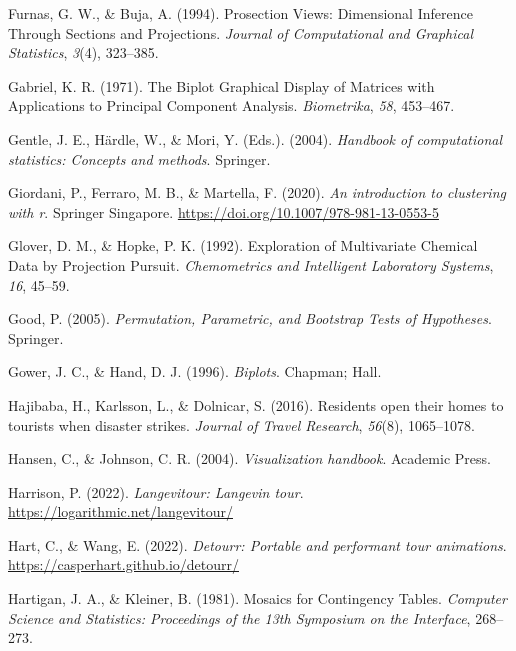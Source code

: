 \documentclass[
  letterpaper,
]{krantz}
\newlength{\cslhangindent}
\newlength{\cslentryspacingunit} %
\newenvironment{CSLReferences}[2] %
 {%
  \setlength{\parindent}{0pt}
  \ifodd #1
  \let\oldpar\par
  \def\par{\hangindent=\cslhangindent\oldpar}
  \fi
  \setlength{\parskip}{#2\cslentryspacingunit}
 }%
 {}
\begin{document}
\begin{CSLReferences}{1}{0}
\leavevmode{}%
Furnas, G. W., \& Buja, A. (1994). Prosection {V}iews: {D}imensional
{I}nference {T}hrough {S}ections and {P}rojections. \emph{Journal of
Computational and Graphical Statistics}, \emph{3}(4), 323--385.

\leavevmode{}%
Gabriel, K. R. (1971). The {B}iplot {G}raphical {D}isplay of {M}atrices
with {A}pplications to {P}rincipal {C}omponent {A}nalysis.
\emph{Biometrika}, \emph{58}, 453--467.

\leavevmode{}%
Gentle, J. E., Härdle, W., \& Mori, Y. (Eds.). (2004). \emph{Handbook of
computational statistics: Concepts and methods}. Springer.

\leavevmode{}%
Giordani, P., Ferraro, M. B., \& Martella, F. (2020). \emph{An
introduction to clustering with r}. Springer Singapore.
\url{https://doi.org/10.1007/978-981-13-0553-5}

\leavevmode{}%
Glover, D. M., \& Hopke, P. K. (1992). {E}xploration of {M}ultivariate
{C}hemical {D}ata by {P}rojection {P}ursuit. \emph{Chemometrics and
Intelligent Laboratory Systems}, \emph{16}, 45--59.

\leavevmode{}%
Good, P. (2005). \emph{Permutation, {P}arametric, and {B}ootstrap
{T}ests of {H}ypotheses}. Springer.

\leavevmode{}%
Gower, J. C., \& Hand, D. J. (1996). \emph{Biplots}. Chapman; Hall.

\leavevmode{}%
Hajibaba, H., Karlsson, L., \& Dolnicar, S. (2016). Residents open their
homes to tourists when disaster strikes. \emph{Journal of Travel
Research}, \emph{56}(8), 1065--1078.

\leavevmode{}%
Hansen, C., \& Johnson, C. R. (2004). \emph{Visualization handbook}.
Academic Press.

\leavevmode{}%
Harrison, P. (2022). \emph{Langevitour: Langevin tour}.
\url{https://logarithmic.net/langevitour/}

\leavevmode{}%
Hart, C., \& Wang, E. (2022). \emph{Detourr: Portable and performant
tour animations}. \url{https://casperhart.github.io/detourr/}

\leavevmode{}%
Hartigan, J. A., \& Kleiner, B. (1981). Mosaics for {C}ontingency
{T}ables. \emph{Computer Science and Statistics: Proceedings of the 13th
Symposium on the Interface}, 268--273.


\end{CSLReferences}
\end{document}
